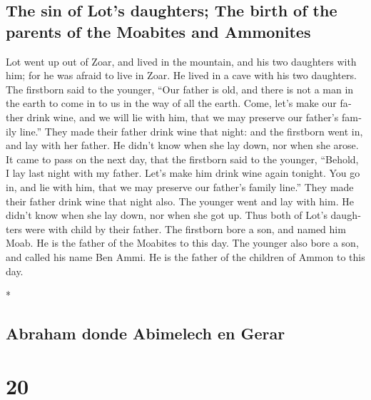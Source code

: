 \begin{paracol}{2}
\begin{otherlanguage}{english}
\hypertarget{the-sin-of-lots-daughters-the-birth-of-the-parents-of-the-moabites-and-ammonites}{%
\subsection{The sin of Lot's daughters; The birth of the parents of the
Moabites and
Ammonites}\label{the-sin-of-lots-daughters-the-birth-of-the-parents-of-the-moabites-and-ammonites}}

 Lot went up out of Zoar, and lived in the mountain, and
his two daughters with him; for he was afraid to live in Zoar. He lived
in a cave with his two daughters.  The firstborn said to
the younger, ``Our father is old, and there is not a man in the earth to
come in to us in the way of all the earth.  Come, let's
make our father drink wine, and we will lie with him, that we may
preserve our father's family line.''  They made their
father drink wine that night: and the firstborn went in, and lay with
her father. He didn't know when she lay down, nor when she arose.
 It came to pass on the next day, that the firstborn said
to the younger, ``Behold, I lay last night with my father. Let's make
him drink wine again tonight. You go in, and lie with him, that we may
preserve our father's family line.''  They made their
father drink wine that night also. The younger went and lay with him. He
didn't know when she lay down, nor when she got up.  Thus
both of Lot's daughters were with child by their father. 
The firstborn bore a son, and named him Moab. He is the father of the
Moabites to this day.  The younger also bore a son, and
called his name Ben Ammi. He is the father of the children of Ammon to
this day.

\end{otherlanguage}

\switchcolumn[0]*

\hypertarget{abraham-donde-abimelech-en-gerar}{%
\subsection{Abraham donde Abimelech en
Gerar}\label{abraham-donde-abimelech-en-gerar}}

\hypertarget{section-38}{%
\section{20}\label{section-38}}


\end{paracol}

